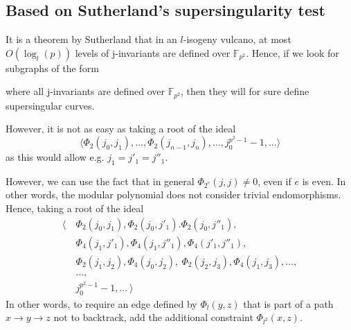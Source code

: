 \documentclass{scrartcl}
\newcommand{\F}{\mathbb{F}}
\theoremstyle{definition}
\begin{document}
\subsection{Based on Sutherland's supersingularity test}
It is a theorem by Sutherland that in an $l$-isogeny vulcano, at most $O(\log_l(p))$ levels of j-invariants are defined over $\F_{p^2}$.
Hence, if we look for subgraphs of the form
\begin{center}
\end{center}
where all j-invariants are defined over $\F_{p^2}$, then they will for sure define supersingular curves.

However, it is not as easy as taking a root of the ideal
\begin{equation*}
    \langle \Phi_2(j_0, j_1), ..., \Phi_2(j_{n - 1}, j_n), ..., j_0^{p^2 - 1} - 1, ... \rangle
\end{equation*}
as this would allow e.g. $j_1 = j'_1 = j''_1$.

However, we can use the fact that in general $\Phi_{2^e}(j, j) \neq 0$, even if $e$ is even.
In other words, the modular polynomial does not consider trivial endomorphisms.
Hence, taking a root of the ideal
\begin{align*}
    \langle \ &\Phi_2(j_0, j_1), \Phi_2(j_0, j'_1). \Phi_2(j_0, j''_1), \\ 
    &\Phi_4(j_1, j'_1), \Phi_4(j_1, j''_1), \Phi_4(j'_1, j''_1), \\
    &\Phi_2(j_1, j_2), \Phi_4(j_0, j_2), \ \Phi_2(j_2, j_3), \Phi_4(j_1, j_3), ..., \\
    &..., \\
    &j_0^{p^2 - 1} - 1, ... \ \rangle
\end{align*}
In other words, to require an edge defined by $\Phi_l(y, z)$ that is part of a path $x \to y \to z$ not to backtrack, add the additional constraint $\Phi_{l^2}(x, z)$.
\end{document}
